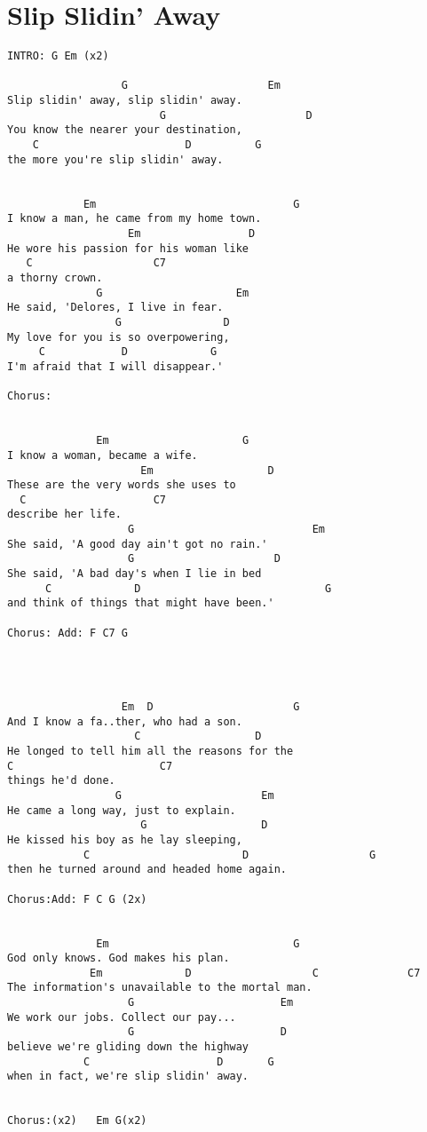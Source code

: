 \documentclass[leqno]{memoir}
\begin{document}
\newpage

\chapter{Slip Slidin' Away}
\begin{verbatim}
INTRO: G Em (x2)   
  
                  G                      Em   
Slip slidin' away, slip slidin' away.   
                        G                      D   
You know the nearer your destination,   
    C                       D          G   
the more you're slip slidin' away.   

  
            Em                               G   
I know a man, he came from my home town.   
                   Em                 D   
He wore his passion for his woman like    
   C                   C7  
a thorny crown.   
              G                     Em   
He said, 'Delores, I live in fear.   
                 G                D   
My love for you is so overpowering,   
     C            D             G   
I'm afraid that I will disappear.'   

Chorus:   

  
              Em                     G   
I know a woman, became a wife.   
                     Em                  D            
These are the very words she uses to   
  C                    C7  
describe her life.   
                   G                            Em   
She said, 'A good day ain't got no rain.'   
                   G                      D   
She said, 'A bad day's when I lie in bed    
      C             D                             G   
and think of things that might have been.'   

Chorus: Add: F C7 G   

  
  
  
                  Em  D                      G   
And I know a fa..ther, who had a son.   
                    C                  D   
He longed to tell him all the reasons for the   
C                       C7  
things he'd done.   
                 G                      Em   
He came a long way, just to explain.   
                     G                  D   
He kissed his boy as he lay sleeping,   
            C                        D                   G   
then he turned around and headed home again.   

Chorus:Add: F C G (2x)  

  
              Em                             G   
God only knows. God makes his plan.   
             Em             D                   C              C7  
The information's unavailable to the mortal man.   
                   G                       Em   
We work our jobs. Collect our pay...   
                   G                       D   
believe we're gliding down the highway   
            C                    D       G   
when in fact, we're slip slidin' away.   


Chorus:(x2)   Em G(x2)   

\end{verbatim}
\newpage
\end{document}

